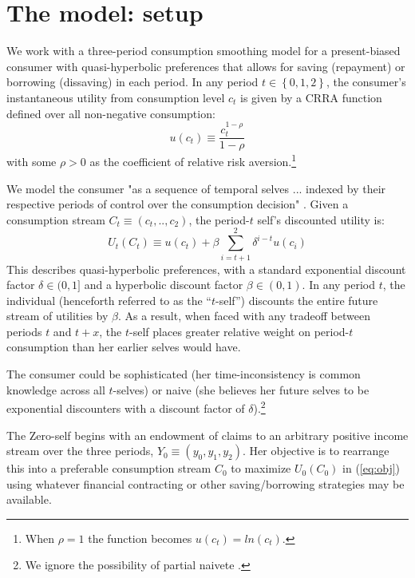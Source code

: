 \documentclass[11pt,english]{article}
\theoremstyle{plain}
\theoremstyle{definition}
\begin{document}
\section{The model: setup}

We work with a three-period consumption smoothing model for a present-biased
consumer with quasi-hyperbolic preferences that allows for saving
(repayment) or borrowing (dissaving) in each period. In any period
$t\in\left\{ 0,1,2\right\} $, the consumer's instantaneous utility
from consumption level $c_{t}$ is given by a CRRA function defined
over all non-negative consumption: 
\begin{equation}
u\left(c_{t}\right)\equiv\frac{c_{t}^{1-\rho}}{1-\rho}
\end{equation}
with some $\rho>0$ as the coefficient of relative risk aversion.\footnote{When $\rho=1$ the function becomes $u(c_{t})=ln(c_{t})$.}

We model the consumer "as a sequence of temporal selves ... indexed
by their respective periods of control over the consumption decision"
\citep[p.451]{laibson1997}. Given a consumption stream $C_{t}\equiv\left(c_{t},..,c_{2}\right)$,
the period-$t$ self's discounted utility is: 
\begin{equation}
U_{t}\left(C_{t}\right)\equiv u\left(c_{t}\right)+\beta\sum\limits _{i=t+1}^{2}\delta^{i-t}u\left(c_{i}\right)\label{eq:obj}
\end{equation}
This describes quasi-hyperbolic preferences, with a standard exponential
discount factor $\delta\in(0,1]$ and a hyperbolic discount factor
$\beta\in(0,1)$. In any period $t$, the individual (henceforth referred
to as the ``$t$-self'') discounts the entire future stream of utilities
by $\beta$. As a result, when faced with any tradeoff between periods $t$ and $t+x$, the $t$-self places greater relative
weight on period-$t$ consumption than her earlier selves would have. 

The consumer could be sophisticated (her time-inconsistency
is common knowledge across all $t$-selves) or naive (she believes
her future selves to be exponential discounters with a discount factor
of $\delta$).\footnote{We ignore the possibility of partial naivete \citep[see][]{odonoghue2001}.}

The Zero-self begins with an endowment of claims to an arbitrary positive
income stream over the three periods, $Y_{0}\equiv\left(y_{0},y_{1},y_{2}\right)$.
Her objective is to rearrange this into a preferable consumption stream
$C_{0}$ to maximize $U_{0}(C_{0})$ in (\ref{eq:obj}) using whatever
financial contracting or other saving/borrowing strategies may
be available.
\end{document}

